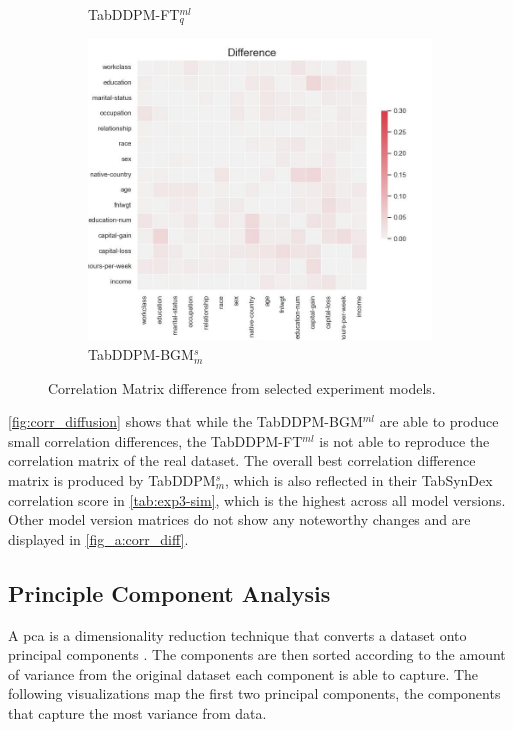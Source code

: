 \begin{figure}[h]
\begin{subfigure}{0.3\textwidth}
		\caption{TabDDPM-FT$^{ml}_q$}
	\end{subfigure}
	\hfill
	\begin{subfigure}{0.3\textwidth}
		\includegraphics[width=\textwidth]{images/correlation_difference/tab-ddpm-bgm-simTune-minmax.jpg}
		\caption{TabDDPM-BGM$^{s}_m$}
	\end{subfigure}
	\caption[Correlation plots Experiment Models]{Correlation Matrix difference from selected experiment models.}
	\label{fig:corr_diffusion}
\end{figure}



\autoref{fig:corr_diffusion} shows that while the TabDDPM-BGM$^{ml}$ are able to produce small correlation differences, the TabDDPM-FT$^{ml}$ is not able to reproduce
the correlation matrix of the real dataset.
The overall best correlation difference matrix is produced by TabDDPM$^{s}_m$, which is also reflected in their TabSynDex correlation score in \autoref{tab:exp3-sim}, which is the highest across all model versions.
Other model version matrices do not show any noteworthy changes and are displayed in \autoref{fig_a:corr_diff}.

\subsection{Principle Component Analysis}
\label{ch:results-pca}

A \gls{pca} is a dimensionality reduction technique that converts a dataset onto principal components \cite{brenninkmeijer2019GenerationEvaluationTabular}.
The components are then sorted according to the amount of variance from the original dataset each component is able to capture.
The following visualizations map the first two principal components, \ie the components that capture the most variance from data.


